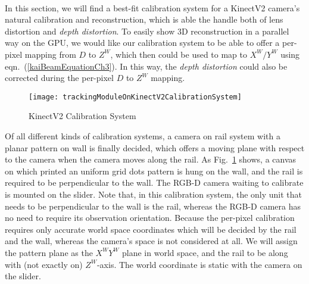 \\\indent
%
In this section, we will find a best-fit calibration system for a KinectV2 camera's natural calibration and reconstruction, which is able the handle both of lens distortion and \emph{depth distortion}. %
To easily show 3D reconstruction in a parallel way on the GPU, we would like our calibration system to be able to offer a per-pixel mapping from \(D\) to \(Z^W\), which then could be used to map to \(X^W/Y^W\) using eqn.~(\ref{kaiBeamEquationCh3}). In this way, the \emph{depth distortion} could also be corrected during the per-pixel \(D\) to \(Z^W\) mapping.
%
\begin{figure}[t]
\centering
\texttt{[image: trackingModuleOnKinectV2CalibrationSystem]}
\caption{KinectV2 Calibration System}
\label{trackingModuleOnKinectV2CalibrationSystemCh3}
\end{figure}%
%
Of all different kinds of calibration systems, a camera on rail system with a planar pattern on wall is finally decided, which offers a moving plane with respect to the camera when the camera moves along the rail. As Fig.~\ref{trackingModuleOnKinectV2CalibrationSystemCh3} shows, a canvas on which printed an uniform grid dots pattern is hung on the wall, and the rail is required to be perpendicular to the wall. The RGB-D camera waiting to calibrate is mounted on the slider. Note that, in this calibration system, the only unit that needs to be perpendicular to the wall is the rail, whereas the RGB-D camera has no need to require its observation orientation. Because the per-pixel calibration requires only accurate world space coordinates which will be decided by the rail and the wall, whereas the camera's space is not considered at all. We will assign the pattern plane as the \(X^WY^W\) plane in world space, and the rail to be along with (not exactly on) \(Z^W\)-axis. The world coordinate is static with the camera on the slider. %
